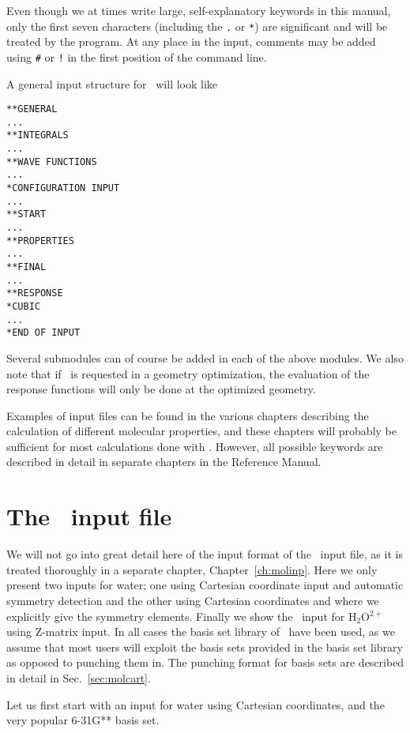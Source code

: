 Even though we at times write large, self-explanatory keywords in this
manual, only the first seven characters (including the \verb|.| or
\verb|*|) are significant and will be
treated by the program. At any
place in the input, comments may be added using
\verb|#| or \verb|!|
in the first position of the command line.

A general input structure for \siraba\ will look like

\begin{verbatim}
**GENERAL
...
**INTEGRALS
...
**WAVE FUNCTIONS
...
*CONFIGURATION INPUT
...
**START
...
**PROPERTIES
...
**FINAL
...
**RESPONSE
*CUBIC
...
*END OF INPUT
\end{verbatim}

Several submodules can of course be added in each of the above
modules. We also note that if \resp\ is requested in a geometry
optimization, the evaluation of the response functions will only be
done at the optimized geometry.

Examples of input files can be found in the various chapters
describing the calculation of different molecular properties, and
these chapters will probably be sufficient for most calculations done
with \siraba . However, all possible keywords are described in detail
in separate chapters in the Reference Manual.

\section{The \mol\ input file}

We will not go into great detail here of the input format of the \mol\ input
file, as it is treated thoroughly in a separate chapter,
Chapter~\ref{ch:molinp}. Here we only present two inputs for
water; one
using Cartesian coordinate input and
automatic symmetry detection and
the other using Cartesian coordinates and where we explicitly give the
symmetry elements. Finally we show the \mol\ input for H$_{2}$O$^{2+}$
using Z-matrix input. In
all cases the basis set library of \siraba\ have been used, as we
assume that most users will exploit the basis sets provided in the basis
set library as opposed to punching them in. The punching
format for basis sets are described in detail in Sec.~\ref{sec:molcart}.

Let us first start with an input for water using Cartesian coordinates,
and the very popular 6-31G** basis set.

